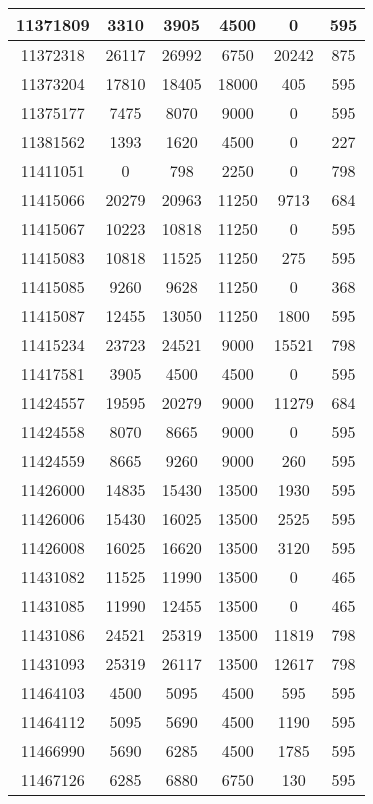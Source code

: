 \begin{appendices}
\begin{center}
\begin{longtable}{|c|c|c|c|c|c|}
11371809 & 3310  & 3905  & 4500  & 0     & 595 \\ \hline
11372318 & 26117 & 26992 & 6750  & 20242 & 875 \\ \hline
11373204 & 17810 & 18405 & 18000 & 405   & 595 \\ \hline
11375177 & 7475  & 8070  & 9000  & 0     & 595 \\ \hline
11381562 & 1393  & 1620  & 4500  & 0     & 227 \\ \hline
11411051 & 0     & 798   & 2250  & 0     & 798 \\ \hline
11415066 & 20279 & 20963 & 11250 & 9713  & 684 \\ \hline
11415067 & 10223 & 10818 & 11250 & 0     & 595 \\ \hline
11415083 & 10818 & 11525 & 11250 & 275   & 595 \\ \hline
11415085 & 9260  & 9628  & 11250 & 0     & 368 \\ \hline
11415087 & 12455 & 13050 & 11250 & 1800  & 595 \\ \hline
11415234 & 23723 & 24521 & 9000  & 15521 & 798 \\ \hline
11417581 & 3905  & 4500  & 4500  & 0     & 595 \\ \hline
11424557 & 19595 & 20279 & 9000  & 11279 & 684 \\ \hline
11424558 & 8070  & 8665  & 9000  & 0     & 595 \\ \hline
11424559 & 8665  & 9260  & 9000  & 260   & 595 \\ \hline
11426000 & 14835 & 15430 & 13500 & 1930  & 595 \\ \hline
11426006 & 15430 & 16025 & 13500 & 2525  & 595 \\ \hline
11426008 & 16025 & 16620 & 13500 & 3120  & 595 \\ \hline
11431082 & 11525 & 11990 & 13500 & 0     & 465 \\ \hline
11431085 & 11990 & 12455 & 13500 & 0     & 465 \\ \hline
11431086 & 24521 & 25319 & 13500 & 11819 & 798 \\ \hline
11431093 & 25319 & 26117 & 13500 & 12617 & 798 \\ \hline
11464103 & 4500  & 5095  & 4500  & 595   & 595 \\ \hline
11464112 & 5095  & 5690  & 4500  & 1190  & 595 \\ \hline
11466990 & 5690  & 6285  & 4500  & 1785  & 595 \\ \hline
11467126 & 6285  & 6880  & 6750  & 130   & 595 \\ \hline

\end{longtable}
\end{center}
\end{appendices}
